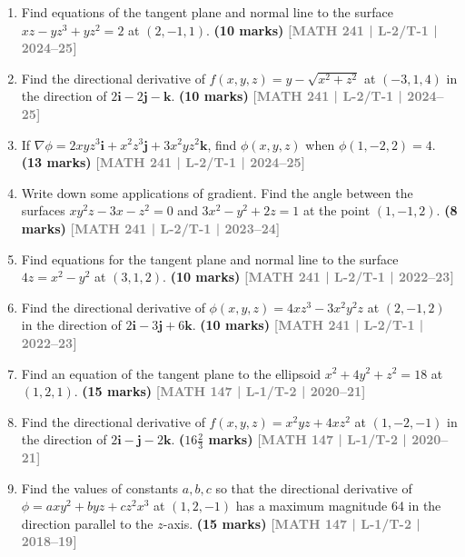 \documentclass[12pt]{article}
\newcommand{\yr}[1]{\hfill\textcolor{gray}{\small\textbf{[#1]}}}
\newcommand{\mk}[1]{\textcolor{orange!70!black}{\small\textbf{(#1 marks)}}}
\begin{document}
\begin{enumerate}
    
\item Find equations of the tangent plane and normal line to the surface $xz-yz^{3}+yz^{2}=2$ at $(2,-1,1)$.
\mk{10} \yr{MATH 241 | L-2/T-1 | 2024--25}



\item Find the directional derivative of $f(x,y,z)=y-\sqrt{x^{2}+z^{2}}$ at $(-3,1,4)$ in the direction of $2\mathbf{i}-2\mathbf{j}-\mathbf{k}$.
\mk{10} \yr{MATH 241 | L-2/T-1 | 2024--25}



\item If $\nabla\phi=2xyz^{3}\mathbf{i}+x^{2}z^{3}\mathbf{j}+3x^{2}yz^{2}\mathbf{k}$, find $\phi(x,y,z)$ when $\phi(1,-2,2)=4$.
\mk{13} \yr{MATH 241 | L-2/T-1 | 2024--25}



\item Write down some applications of gradient. Find the angle between the surfaces $xy^{2}z-3x-z^{2}=0$ and $3x^{2}-y^{2}+2z=1$ at the point $(1,-1,2)$.
\mk{8} \yr{MATH 241 | L-2/T-1 | 2023--24}



\item Find equations for the tangent plane and normal line to the surface $4z=x^{2}-y^{2}$ at $(3,1,2)$.
\mk{10} \yr{MATH 241 | L-2/T-1 | 2022--23}



\item Find the directional derivative of $\phi(x,y,z)=4xz^{3}-3x^{2}y^{2}z$ at $(2,-1,2)$ in the direction of $2\mathbf{i}-3\mathbf{j}+6\mathbf{k}$.
\mk{10} \yr{MATH 241 | L-2/T-1 | 2022--23}



\item Find an equation of the tangent plane to the ellipsoid $x^{2}+4y^{2}+z^{2}=18$ at $(1,2,1)$.
\mk{15} \yr{MATH 147 | L-1/T-2 | 2020--21}



\item Find the directional derivative of $f(x,y,z)=x^{2}yz+4xz^{2}$ at $(1,-2,-1)$ in the direction of $2\mathbf{i}-\mathbf{j}-2\mathbf{k}$.
\mk{$16\tfrac{2}{3}$} \yr{MATH 147 | L-1/T-2 | 2020--21}



\item Find the values of constants $a,b,c$ so that the directional derivative of $\phi=axy^{2}+byz+cz^{2}x^{3}$ at $(1,2,-1)$ has a maximum magnitude 64 in the direction parallel to the $z$-axis.
\mk{15} \yr{MATH 147 | L-1/T-2 | 2018--19}




\end{enumerate}
\end{document}
